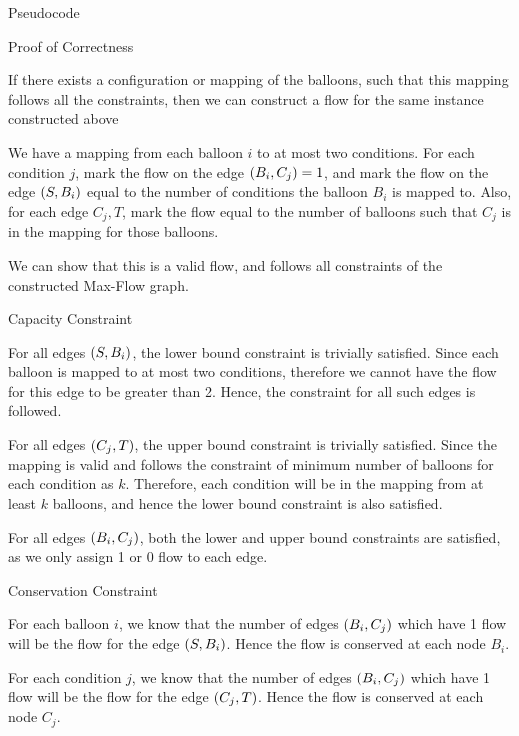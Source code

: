 \documentclass{article}
\begin{document}
\begin{question}
\begin{qpart}{1}
\begin{qsection}{Pseudocode}
		\end{qsection}

		\begin{qsection}{Proof of Correctness}

			\begin{qproof}{If there exists a configuration or mapping of the balloons, such that this mapping follows all the constraints, then we can construct a flow for the same instance constructed above}

				We have a mapping from each balloon $i$ to at most two conditions. For each condition $j$, mark the flow on the edge $\left( B_i, C_j \right) = 1$, and mark the flow on the edge $\left( S, B_i \right)$ equal to the number of conditions the balloon $B_i$ is mapped to. Also, for each edge $C_j, T$, mark the flow equal to the number of balloons such that $C_j$ is in the mapping for those balloons. \br%

				We can show that this is a valid flow, and follows all constraints of the constructed Max-Flow graph. \br%

				\begin{qsubsection}{Capacity Constraint}

					For all edges $\left( S, B_i \right)$, the lower bound constraint is trivially satisfied. Since each balloon is mapped to at most two conditions, therefore we cannot have the flow for this edge to be greater than 2. Hence, the constraint for all such edges is followed. \br%

					For all edges $\left( C_j, T \right)$, the upper bound constraint is trivially satisfied. Since the mapping is valid and follows the constraint of minimum number of balloons for each condition as $k$. Therefore, each condition will be in the mapping from at least $k$ balloons, and hence the lower bound constraint is also satisfied. \br%

					For all edges $\left( B_i, C_j \right)$, both the lower and upper bound constraints are satisfied, as we only assign 1 or 0 flow to each edge.

				\end{qsubsection}

				\begin{qsubsection}{Conservation Constraint}

					For each balloon $i$, we know that the number of edges $\left( B_i, C_j \right)$ which have 1 flow will be the flow for the edge $\left( S, B_i \right)$. Hence the flow is conserved at each node $B_i$. \br%

					For each condition $j$, we know that the number of edges $\left( B_i, C_j \right)$ which have 1 flow will be the flow for the edge $\left( C_j, T \right)$. Hence the flow is conserved at each node $C_j$.


\end{qsubsection}
\end{qproof}
\end{qsection}
\end{qpart}
\end{question}
\end{document}
